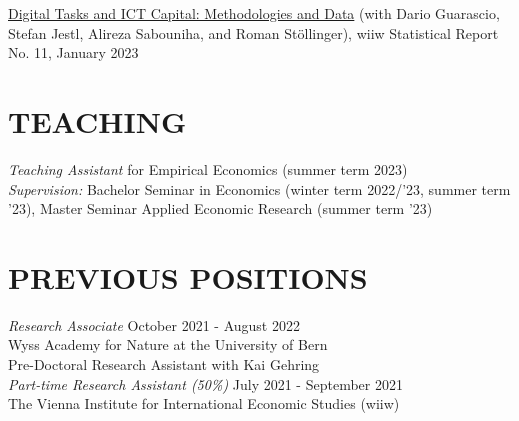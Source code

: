 \documentclass[margin, 12pt]{res} %
\begin{document}
\begin{resume}
		\href{https://wiiw.ac.at/digital-tasks-and-ict-capital-methodologies-and-data-p-6429.html}{Digital Tasks and ICT Capital: Methodologies and Data} (with Dario Guarascio, Stefan Jestl, Alireza Sabouniha, and Roman Stöllinger), wiiw Statistical Report No. 11, January 2023
		
		
		
		\section{TEACHING}
		{\sl Teaching Assistant} for Empirical Economics (summer term 2023)\\
		{\sl Supervision:} Bachelor Seminar in Economics (winter term 2022/'23, summer term '23), Master Seminar Applied Economic Research (summer term '23)

		
		\section{PREVIOUS POSITIONS}
		{\sl Research Associate} \hfill October 2021 - August 2022\\ Wyss Academy for Nature at the University of Bern\\
		Pre-Doctoral Research Assistant with Kai Gehring \vspace{0.2cm} \\
		{\sl Part-time Research Assistant (50\%)} \hfill July 2021 - September 2021\\
		The Vienna Institute for International Economic Studies (wiiw)
		

\end{resume}
\end{document}

